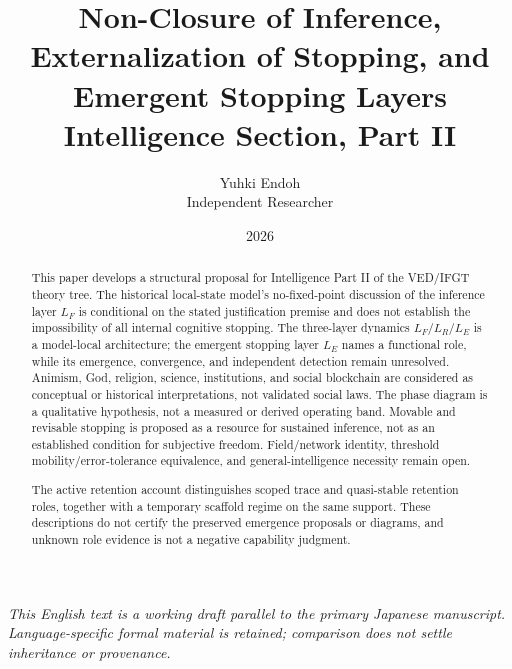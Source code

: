 \documentclass[11pt,a4paper]{article}
\title{Non-Closure of Inference, Externalization of Stopping, and Emergent Stopping Layers\\
{\large Intelligence Section, Part II}}
\author{Yuhki Endoh\\{\small Independent Researcher}}
\date{2026}
\begin{document}
\maketitle

\noindent\textit{This English text is a working draft parallel to the primary Japanese manuscript. Language-specific formal material is retained; comparison does not settle inheritance or provenance.}


\begin{abstract}
This paper develops a structural proposal for Intelligence Part II of the VED/IFGT theory tree. The historical local-state model's no-fixed-point discussion of the inference layer $L_F$ is conditional on the stated justification premise and does not establish the impossibility of all internal cognitive stopping. The three-layer dynamics $L_F/L_R/L_E$ is a model-local architecture; the emergent stopping layer $L_E$ names a functional role, while its emergence, convergence, and independent detection remain unresolved. Animism, God, religion, science, institutions, and social blockchain are considered as conceptual or historical interpretations, not validated social laws. The phase diagram is a qualitative hypothesis, not a measured or derived operating band. Movable and revisable stopping is proposed as a resource for sustained inference, not as an established condition for subjective freedom. Field/network identity, threshold mobility/error-tolerance equivalence, and general-intelligence necessity remain open.

The active retention account distinguishes scoped trace and quasi-stable retention roles, together with a temporary scaffold regime on the same support. These descriptions do not certify the preserved emergence proposals or diagrams, and unknown role evidence is not a negative capability judgment.
\end{abstract}

\setcounter{tocdepth}{2}
\tableofcontents
\clearpage

\setcounter{section}{-1}















\appendix








\end{document}

